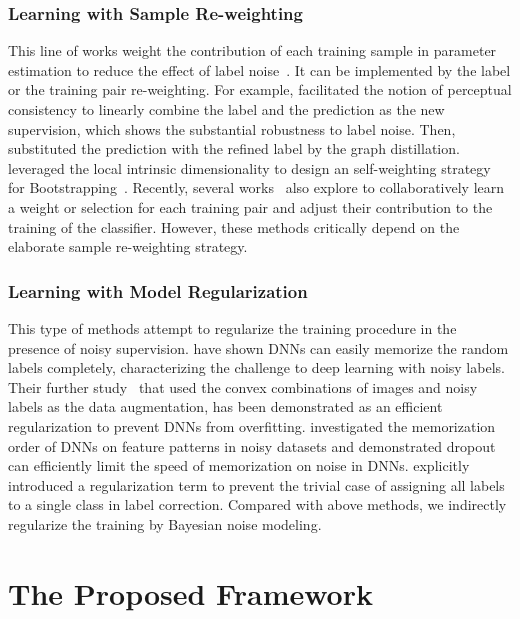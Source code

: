 \documentclass[journal]{IEEEtran}
\begin{document}
\subsubsection{Learning with Sample Re-weighting}
This line of works weight the contribution of each training sample in parameter estimation to reduce the effect of label noise~\cite{liu2016classification,pmlr-v80-ren18a}. It can be implemented by the label or the training pair re-weighting. For example, \citet{reed2014training} facilitated the notion of perceptual consistency to linearly combine the label and the prediction as the new supervision, which shows the substantial robustness to label noise. Then, \citet{li2017learning} substituted the prediction with the refined label by the graph distillation. \citet{wang2018iterative} leveraged the local intrinsic dimensionality to design an self-weighting strategy for Bootstrapping~\cite{reed2014training}. Recently, several works~\cite{jiang2017mentornet,NIPS2018_7454,Han2018CoteachingRT} also explore to collaboratively learn a weight or selection for each training pair and adjust their contribution to the training of the classifier. However, these methods critically depend on the elaborate sample re-weighting strategy.

\subsubsection{Learning with Model Regularization}
This type of methods attempt to regularize the training procedure in the presence of noisy supervision. \citet{zhang2016understanding} have shown DNNs can easily memorize the random labels completely, characterizing the challenge to deep learning with noisy labels. 
Their further study~\cite{zhang2017mixup} that used the convex combinations of images and noisy labels as the data augmentation, has been demonstrated as an efficient regularization to prevent DNNs from overfitting. \citet{arpit2017closer} investigated the memorization order of DNNs on feature patterns in noisy datasets and demonstrated dropout can efficiently limit the speed of memorization on noise in DNNs. \citet{tanaka2018joint} explicitly introduced a regularization term to prevent the trivial case of assigning all labels to a single class in label correction. Compared with above methods, we indirectly regularize the training by Bayesian noise modeling.

\section{The Proposed Framework}
\end{document}
